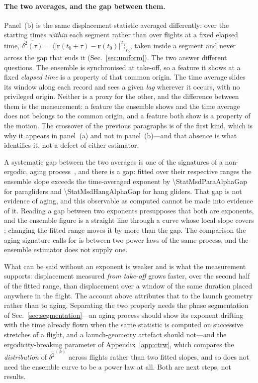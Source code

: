 \begin{revblock}
\paragraph{The two averages, and the gap between them.}
Panel~(b) is the same displacement statistic averaged differently: over the starting times
\emph{within} each segment rather than over flights at a fixed elapsed time,
$\overline{\delta^2(\tau)}=\langle|\mathbf{r}(t_0+\tau)-\mathbf{r}(t_0)|^2\rangle_{t_0}$,
taken inside a segment and never across the gap that ends it (Sec.~\ref{sec:uniform}). The
two answer different questions. The ensemble is synchronised at take-off, so a feature it
shows at a fixed \emph{elapsed time} is a property of that common origin. The time average
slides its window along each record and sees a given \emph{lag} wherever it occurs, with
no privileged origin. Neither is a proxy for the other, and the difference between them
is the measurement: a feature the ensemble shows and the time average does not belongs to
the common origin, and a feature both show is a property of the motion. The crossover of
the previous paragraphs is of the first kind, which is why it appears in panel~(a) and not
in panel~(b)---and that absence is what identifies it, not a defect of either estimator.

A systematic gap between the two averages is one of the signatures of a non-ergodic,
aging process~\cite{he2008}, and there is a gap: fitted over their respective ranges the
ensemble slope exceeds the time-averaged exponent by \num{\StatMsdParaAlphaGap} for
paragliders and \num{\StatMsdHangAlphaGap} for hang gliders. That gap is not evidence of
aging, and this observable as computed cannot be made into evidence of it. Reading a gap
between two exponents presupposes that both are exponents, and the ensemble figure is a
straight line through a curve whose local slope covers \StatAuditParaEaSlopeSwing;
changing the fitted range moves it by more than the gap. The comparison the aging
signature calls for is between two power laws of the same process, and the ensemble
estimator does not supply one.

What can be said without an exponent is weaker and is what the measurement supports:
displacement measured \emph{from take-off} grows faster, over the second half of the
fitted range, than displacement over a window of the same duration placed anywhere in the
flight. The account above attributes that to the launch geometry rather than to aging.
Separating the two properly needs the phase segmentation of
Sec.~\ref{sec:segmentation}---an aging process should show its exponent drifting with the
time already flown when the same statistic is computed on successive stretches of a
flight, and a launch-geometry artefact should not---and the ergodicity-breaking parameter
of Appendix~\ref{app:ctrw}, which compares the \emph{distribution} of
$\overline{\delta^2}^{(k)}$ across flights rather than two fitted slopes, and so does not
need the ensemble curve to be a power law at all. Both are next steps, not results.


\end{revblock}
